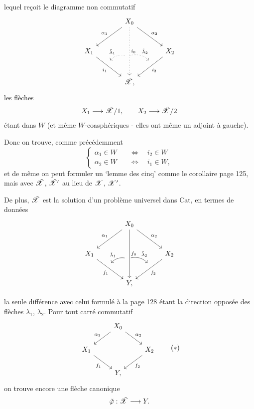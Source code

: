 lequel reçoit le diagramme non commutatif
\[
\begin{tikzcd}[row sep=large, column sep=large]
 & X_0 \arrow[dl, "\alpha_1"'] \arrow[dr, "\alpha_2"] \arrow[dd, dotted, "i_0", ""'{name=J0, pos=0.6}] & \\
X_1 \arrow[dr, "i_1"', ""{name=J1, pos=0.4}] & & X_2 \arrow[dl, "i_2", ""'{name=J2, pos=0.4}] \\
 & \tX, &
\arrow[from=J0, to=J1, dotted, bend right, "\tilde{\lambda}_1"', shorten <=2pt, shorten >=2pt]
\arrow[from=J0, to=J2, dotted, bend left, "\tilde{\lambda}_2", shorten <=2pt, shorten >=2pt]
\end{tikzcd}
\]
les flèches
\[
X_1 \longrightarrow \tilde{\mathscr{X}}/1, \qquad X_2 \longrightarrow \tilde{\mathscr{X}}/2
\]
étant dans $W$ (et même $W$-coasphériques - elles ont même un adjoint à gauche).

Donc on trouve, comme précédemment
\[
\left\{
\begin{aligned}
\alpha_1 \in W &\quad\iff\quad i_2 \in W \\
\alpha_2 \in W &\quad\iff\quad i_1 \in W,
\end{aligned}
\right.
\]
et de même on peut formuler un ‘lemme des cinq’ comme le corollaire page 125, mais avec $\tilde{\mathscr{X}}$, $\tilde{\mathscr{X}}'$ au lieu de $\mathscr{X}$, $\mathscr{X}'$.

De plus, $\tilde{\mathscr{X}}$ est la solution d'un problème universel dans Cat, en termes de données
\[
\begin{tikzcd}[row sep=large, column sep=large]
 & X_0 \arrow[dl, "\alpha_1"'] \arrow[dr, "\alpha_2"] \arrow[dd, "f_0", ""'{name=G0, pos=0.6}] & \\
X_1 \arrow[dr, "f_1"', ""{name=G1, pos=0.4}] & & X_2 \arrow[dl, "f_2", ""'{name=G2, pos=0.4}] \\
 & Y, &
\arrow[from=G0, to=G1, bend right, "\tilde{\lambda}_1"', shorten <=2pt, shorten >=2pt]
\arrow[from=G0, to=G2, bend left, "\tilde{\lambda}_2", shorten <=2pt, shorten >=2pt]
\end{tikzcd}
\]

la seule différence avec celui formulé à la page 128 étant la direction opposée des flèches $\lambda_1$, $\lambda_2$. Pour tout carré commutatif
\[
\begin{tikzcd}
 & X_0 \arrow[dl, "\alpha_1"'] \arrow[dr, "\alpha_2"] & \\
X_1 \arrow[dr, "f_1"'] & & X_2 \arrow[dl, "f_2"] \\
 & Y, &
\end{tikzcd}
\tag*{$(*)$}
\]
on trouve encore une flèche canonique
\[
\tilde{\varphi} : \tilde{\mathscr{X}} \longrightarrow Y.
\]

